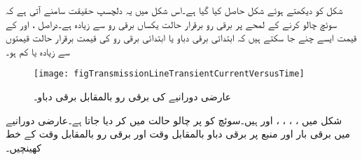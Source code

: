 شکل  کو دیکھتے ہوئے شکل  حاصل کیا گیا ہے۔اس شکل میں یہ دلچسپ حقیقت  سامنے آتی ہے کہ سوئچ چالو کرنے کے لمحے پر برقی رو برقرار حالت یکساں برقی رو سے زیادہ ہے۔دراصل ،  اور  کے قیمت ایسے چنے جا سکتے ہیں کہ ابتدائی برقی دباو یا ابتدائی برقی رو کی قیمت برقرار حالت قیمتوں سے زیادہ یا کم ہو۔
\begin{figure}
\centering
\texttt{[image: figTransmissionLineTransientCurrentVersusTime]}
\caption{عارضی دورانیے کی برقی رو بالمقابل برقی دباو۔}
\label{شکل_ترسیلی_عارضی_برقی_رو_بالمقابل_وقت}
\end{figure}

شکل  میں ، ، ، ،  اور  ہیں۔سوئچ کو  پر چالو حالت میں کر دیا جاتا ہے۔عارضی دورانیے میں برقی بار اور منبع  پر برقی دباو بالمقابل وقت اور  برقی رو بالمقابل وقت کے خط کھینچیں۔

